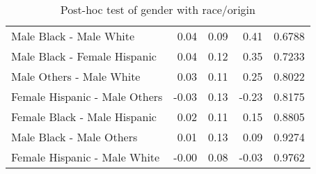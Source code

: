 \documentclass[11pt]{extarticle} %
\begin{document}
\begin{table}[H]
\begin{tabular}{lrrrr}
    Male Black -  Male White & 0.04 & 0.09 & 0.41 & 0.6788 \\ 
    Male Black -  Female Hispanic & 0.04 & 0.12 & 0.35 & 0.7233 \\ 
    Male Others -  Male White & 0.03 & 0.11 & 0.25 & 0.8022 \\ 
    Female Hispanic -  Male Others & -0.03 & 0.13 & -0.23 & 0.8175 \\ 
    Female Black -  Male Hispanic & 0.02 & 0.11 & 0.15 & 0.8805 \\ 
    Male Black -  Male Others & 0.01 & 0.13 & 0.09 & 0.9274 \\ 
    Female Hispanic -  Male White & -0.00 & 0.08 & -0.03 & 0.9762 \\ 
   \hline
\end{tabular}
\caption{Post-hoc test of gender with race/origin} 
\label{tab:DisabGenderRaceOrigin}
\end{table}

\newpage

\end{document}
